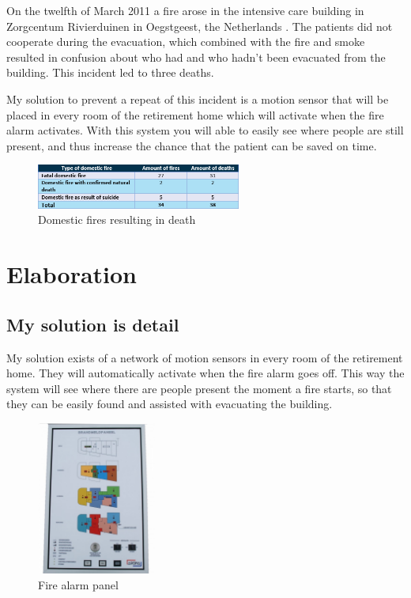\documentclass[12pt]{report}
\begin{document}
On the twelfth of March 2011 a fire arose in the intensive care building in Zorgcentum Rivierduinen in Oegstgeest, the Netherlands \cite{2012}. The patients did not cooperate during the evacuation, which combined with the fire and smoke resulted in confusion about who had and who hadn’t been evacuated from the building. This incident led to three deaths.

My solution to prevent a repeat of this incident is a motion sensor that will be placed in every room of the retirement home which will activate when the fire alarm activates. With this system you will able to easily see where people are still present, and thus increase the chance that the patient can be saved on time.
\begin{figure}[!ht]
	\centering
	\includegraphics[width=0.6\textwidth]{images/Tabel_Doden_brand.png}
	\caption{Domestic fires resulting in death}
	\centering
	\label{label:file_name}
\end{figure}


\chapter{Elaboration}
\section{My solution is detail}
My solution exists of a network of motion sensors in every room of the retirement home. They will automatically activate when the fire alarm goes off. This way the system will see where there are people present the moment a fire starts, so that they can be easily found and assisted with evacuating the building.

\begin{figure}
	\vspace{-40pt}
	\begin{center}
		\includegraphics[width=0.35\textwidth]{images/brandpaneel.jpg}
	\end{center}
	\vspace{-20pt}
	\caption{Fire alarm panel}
	\label{label:file_name}
\end{figure}
\end{document}
